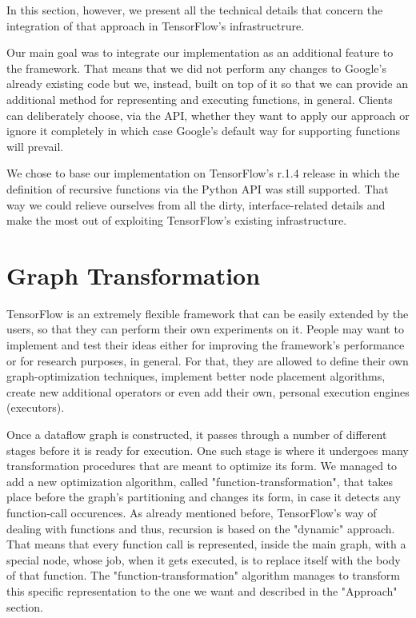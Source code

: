 \documentclass[ack,preface]{dithesis}
\begin{document}
In this section, however, we present all the technical details that concern the integration of that approach in TensorFlow's infrastructrure.

Our main goal was to integrate our implementation as an additional feature to the framework. That means that we did not perform any changes to Google's already existing code but we, instead, built on top of it so that we can provide an additional method for representing and executing functions, in general. Clients can deliberately choose, via the API, whether they want to apply our approach or ignore it completely in which case Google's default way for supporting functions will prevail.

We chose to base our implementation on TensorFlow's r.1.4 release in which the definition of recursive functions via the Python API was still supported. That way we could relieve ourselves from all the dirty, interface-related details and make the most out of exploiting TensorFlow's existing infrastructure.  



    \section{Graph Transformation}

TensorFlow is an extremely flexible framework that  can be easily extended by the users, so that they can perform their own experiments on it. People may want to implement and test their  ideas either for improving the framework's performance or for research purposes, in general. For that, they are allowed to define their own graph-optimization techniques, implement better node placement algorithms, create new additional operators or even add their own, personal execution engines (executors).

Once a dataflow graph is constructed, it passes through a number of different stages before it is ready for execution. One such stage is where it undergoes many transformation procedures that are meant to optimize its form. We managed to add a new optimization algorithm, called "function-transformation", that takes place before the graph's partitioning and changes its form, in case it detects any function-call occurences.
As already mentioned before, TensorFlow's  way of dealing with functions and thus, recursion is based on the "dynamic" approach. That means that every function call is represented, inside the main graph, with a special node, whose job, when it gets executed, is to replace itself with the body of that function. The "function-transformation" algorithm  manages to transform this specific representation to the one we want and described in the "Approach" section. 
\end{document}
